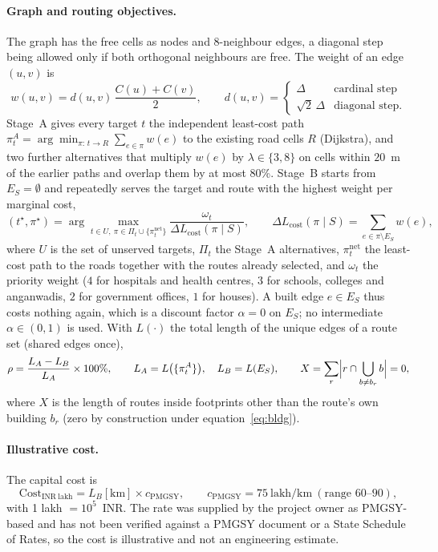 \documentclass[12pt,a4paper]{article}
\newcommand{\Lcost}{L_{\mathrm{cost}}}
\begin{document}
\paragraph{Graph and routing objectives.} The graph has the free cells as nodes and 8-neighbour edges, a diagonal step being allowed only if both orthogonal neighbours are free. The weight of an edge $(u,v)$ is
\begin{equation}
w(u,v)=d(u,v)\,\frac{C(u)+C(v)}{2},\qquad d(u,v)=\begin{cases}\Delta&\text{cardinal step}\\ \sqrt2\,\Delta&\text{diagonal step.}\end{cases}
\label{eq:edge}
\end{equation}
Stage~A gives every target $t$ the independent least-cost path $\pi_t^{A}=\arg\min_{\pi:\,t\to R}\sum_{e\in\pi}w(e)$ to the existing road cells $R$ (Dijkstra), and two further alternatives that multiply $w(e)$ by $\lambda\in\{3,8\}$ on cells within $20$~m of the earlier paths and overlap them by at most 80\%. Stage~B starts from $E_S=\emptyset$ and repeatedly serves the target and route with the highest weight per marginal cost,
\begin{equation}
(t^\star,\pi^\star)=\arg\max_{t\in U,\ \pi\in\Pi_t\cup\{\pi_t^{\mathrm{net}}\}}\frac{\omega_t}{\Delta\Lcost(\pi\mid S)},\qquad
\Delta\Lcost(\pi\mid S)=\sum_{e\in\pi\setminus E_S}w(e),
\label{eq:stageb}
\end{equation}
where $U$ is the set of unserved targets, $\Pi_t$ the Stage~A alternatives, $\pi_t^{\mathrm{net}}$ the least-cost path to the roads together with the routes already selected, and $\omega_t$ the priority weight ($4$ for hospitals and health centres, $3$ for schools, colleges and anganwadis, $2$ for government offices, $1$ for houses). A built edge $e\in E_S$ thus costs nothing again, which is a discount factor $\alpha=0$ on $E_S$; no intermediate $\alpha\in(0,1)$ is used. With $L(\cdot)$ the total length of the unique edges of a route set (shared edges once),
\begin{equation}
\rho=\frac{L_A-L_B}{L_A}\times100\%,\qquad L_A=L\bigl(\{\pi_t^A\}\bigr),\quad L_B=L(E_S),\qquad X=\sum_{r}\Bigl|r\cap\bigcup_{b\ne b_r}b\Bigr|=0,
\label{eq:saving}
\end{equation}
where $X$ is the length of routes inside footprints other than the route's own building $b_r$ (zero by construction under equation~\ref{eq:bldg}).

\paragraph{Illustrative cost.} The capital cost is
\begin{equation}
\mathrm{Cost}_{\mathrm{INR\ lakh}}=L_B[\mathrm{km}]\times c_{\mathrm{PMGSY}},\qquad c_{\mathrm{PMGSY}}=75\ \text{lakh/km}\ (\text{range }60\text{--}90),
\label{eq:cost}
\end{equation}
with 1 lakh $=10^{5}$~INR. The rate was supplied by the project owner as PMGSY-based and has not been verified against a PMGSY document or a State Schedule of Rates, so the cost is illustrative and not an engineering estimate.
\end{document}
